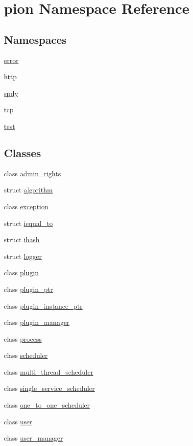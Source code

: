 \hypertarget{namespacepion}{\section{pion Namespace Reference}
\label{namespacepion}
}
\subsection*{Namespaces}
\begin{DoxyCompactItemize}
\item 
\hyperlink{namespacepion_1_1error}{error}
\item 
\hyperlink{namespacepion_1_1http}{http}
\item 
\hyperlink{namespacepion_1_1spdy}{spdy}
\item 
\hyperlink{namespacepion_1_1tcp}{tcp}
\item 
\hyperlink{namespacepion_1_1test}{test}
\end{DoxyCompactItemize}
\subsection*{Classes}
\begin{DoxyCompactItemize}
\item 
class \hyperlink{classpion_1_1admin__rights}{admin\-\_\-rights}
\item 
struct \hyperlink{structpion_1_1algorithm}{algorithm}
\item 
class \hyperlink{classpion_1_1exception}{exception}
\item 
struct \hyperlink{structpion_1_1iequal__to}{iequal\-\_\-to}
\item 
struct \hyperlink{structpion_1_1ihash}{ihash}
\item 
struct \hyperlink{structpion_1_1logger}{logger}
\item 
class \hyperlink{classpion_1_1plugin}{plugin}
\item 
class \hyperlink{classpion_1_1plugin__ptr}{plugin\-\_\-ptr}
\item 
class \hyperlink{classpion_1_1plugin__instance__ptr}{plugin\-\_\-instance\-\_\-ptr}
\item 
class \hyperlink{classpion_1_1plugin__manager}{plugin\-\_\-manager}
\item 
class \hyperlink{classpion_1_1process}{process}
\item 
class \hyperlink{classpion_1_1scheduler}{scheduler}
\item 
class \hyperlink{classpion_1_1multi__thread__scheduler}{multi\-\_\-thread\-\_\-scheduler}
\item 
class \hyperlink{classpion_1_1single__service__scheduler}{single\-\_\-service\-\_\-scheduler}
\item 
class \hyperlink{classpion_1_1one__to__one__scheduler}{one\-\_\-to\-\_\-one\-\_\-scheduler}
\item 
class \hyperlink{classpion_1_1user}{user}
\item 
class \hyperlink{classpion_1_1user__manager}{user\-\_\-manager}
\end{DoxyCompactItemize}
